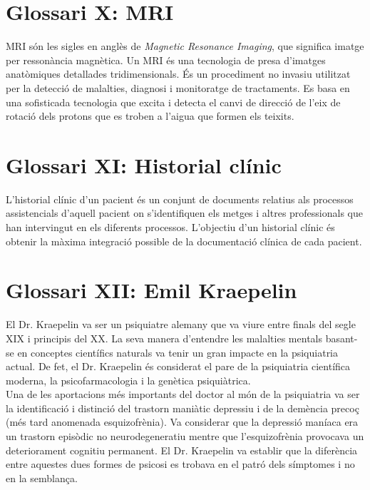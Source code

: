 \documentclass[a4paper,12pt]{report}
\begin{document}
\section*{Glossari X: MRI}
MRI són les sigles en anglès de \textit{Magnetic Resonance Imaging}, que significa imatge per ressonància magnètica. Un MRI és una tecnologia de presa d'imatges anatòmiques detallades tridimensionals. És un procediment no invasiu utilitzat per la detecció de malalties, diagnosi i monitoratge de tractaments. Es basa en una sofisticada tecnologia que excita i detecta el canvi de direcció de l'eix de rotació dels protons que es troben a l'aigua que formen els teixits.
\section*{Glossari XI: Historial clínic}
L'historial clínic d'un pacient és un conjunt de documents relatius als processos assistencials d'aquell pacient on s'identifiquen els metges i altres professionals que han intervingut en els diferents processos. L'objectiu d'un historial clínic és obtenir la màxima integració possible de la documentació clínica de cada pacient.
\section*{Glossari XII: Emil Kraepelin}
El Dr. Kraepelin va ser un psiquiatre alemany que va viure entre finals del segle XIX i principis del XX. La seva manera d'entendre les malalties mentals basant-se en conceptes científics naturals va tenir un gran impacte en la psiquiatria actual. De fet, el Dr. Kraepelin és considerat el pare de la psiquiatria científica moderna, la psicofarmacologia i la genètica psiquiàtrica.\\
Una de les aportacions més importants del doctor al món de la psiquiatria va ser la identificació i distinció del trastorn maniàtic depressiu i de la demència precoç (més tard anomenada esquizofrènia). Va considerar que la depressió maníaca era un trastorn episòdic no neurodegeneratiu mentre que l'esquizofrènia provocava un deteriorament cognitiu permanent. El Dr. Kraepelin va establir que la diferència entre aquestes dues formes de psicosi es trobava en el patró dels símptomes i no en la semblança.
\end{document}
